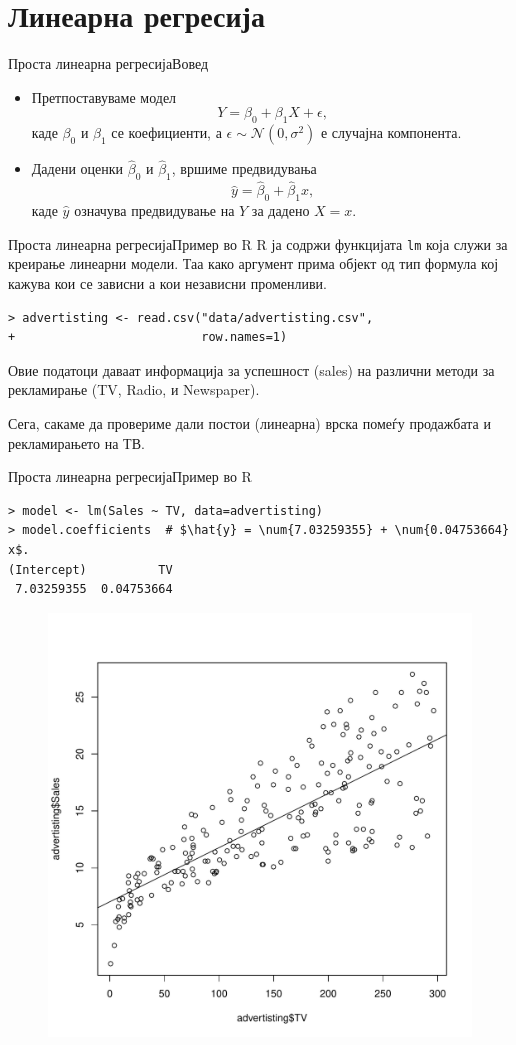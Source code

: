 \documentclass[hyperref={unicode}, xcolor={svgnames, table},
usepdftitle=false]{beamer}
\theoremstyle{remark}
\begin{document}
\section{Линеарна регресија}

\begin{frame}{Проста линеарна регресија}{Вовед}
  \begin{itemize}
  \item Претпоставуваме модел
    \[
      Y = \beta_0 + \beta_1 X + \epsilon\text{,}
    \]
    каде \(\beta_0\) и \(\beta_1\) се коефициенти, а
    \(\epsilon \sim \mathcal{N}(0, \sigma^2)\) е случајна компонента.
  \item Дадени оценки \(\hat{\beta}_0\) и \(\hat{\beta}_1\), вршиме предвидувања
    \[
      \hat{y} = \hat{\beta}_0 + \hat{\beta}_1 x\text{,}
    \]
    каде \(\hat{y}\) означува предвидување на \(Y\) за дадено \(X = x\).
  \end{itemize}
\end{frame}

\begin{frame}[fragile]{Проста линеарна регресија}{Пример во R}
  R ја содржи функцијата \texttt{lm} која служи за креирање линеарни
  модели.  Таа како аргумент прима објект од тип формула кој кажува кои се
  зависни а кои независни променливи.
\begin{verbatim}
> advertisting <- read.csv("data/advertisting.csv",
+                          row.names=1)
\end{verbatim}
  Овие податоци даваат информација за успешност (sales) на различни методи за
  рекламирање (TV, Radio, и Newspaper).

  Сега, сакаме да провериме дали постои (линеарна) врска помеѓу продажбата и
  рекламирањето на ТВ.
\end{frame}

\begin{frame}[fragile]{Проста линеарна регресија}{Пример во R}
\begin{verbatim}
> model <- lm(Sales ~ TV, data=advertisting)
> model.coefficients  # $\hat{y} = \num{7.03259355} + \num{0.04753664} x$.
(Intercept)          TV
 7.03259355  0.04753664
\end{verbatim}
  \begin{figure}
    \centering
    \includegraphics[width=.45\textwidth]{Plot_Simple_Regression.pdf}
  \end{figure}
\end{frame}
\end{document}
